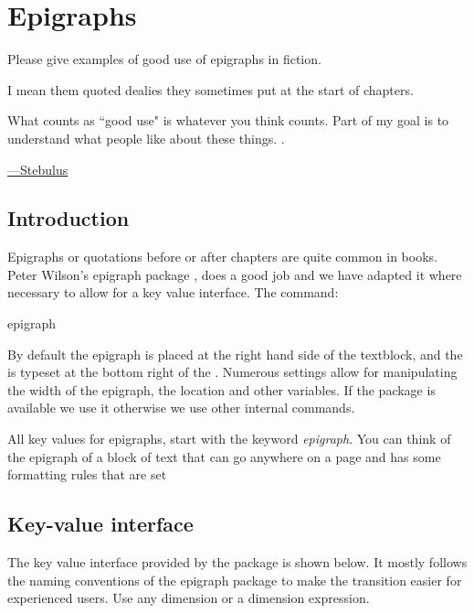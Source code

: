 

\chapter{Epigraphs}
\label{c:epigraphs}

\epigraph{Please give examples of good use of epigraphs in fiction.

I mean them quoted dealies they sometimes put at the start of chapters.

What counts as ``good use" is whatever you think counts. Part of my goal is to understand what people like about these things.
.}{\href{http://ask.metafilter.com/207423/Good-use-of-epigraphs-in-fiction}{---Stebulus}}



\section{Introduction}

Epigraphs or quotations before or after chapters are quite common in books. Peter Wilson's epigraph package \citep{epigraph}, 
does a good job and we have adapted it where necessary to allow for a key value interface. The command:


\begin{docCommand}{epigraph}{ }{ }
\end{docCommand}

By default the epigraph is placed at the right
hand side of the textblock, and the  is typeset at the bottom right of the . 
Numerous settings allow for manipulating the width of the epigraph, the location and other 
variables. If the package is available we use it otherwise we use other internal commands.

All key values for epigraphs, start with the keyword \emph{epigraph}. You can think of the epigraph of a block of text that can go anywhere on a page and has some formatting rules that are set 

\section{Key-value interface}
The key value interface provided by the package is shown below. It mostly follows the 
naming conventions of the epigraph package to make the transition easier for experienced users. Use any dimension or a dimension expression.
\medskip

